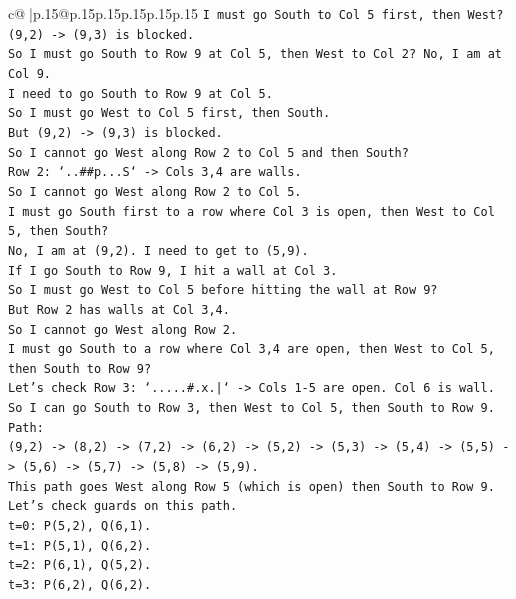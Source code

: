 \documentclass{article}
\begin{document}
{\begin{supertabular}{c@{$\;$}|p{.15\linewidth}@{}p{.15\linewidth}p{.15\linewidth}p{.15\linewidth}p{.15\linewidth}p{.15\linewidth}}
{{{\texttt{I must go South to Col 5 first, then West?} \\
\texttt{(9,2) {-}> (9,3) is blocked.} \\
\texttt{So I must go South to Row 9 at Col 5, then West to Col 2? No, I am at Col 9.} \\
\texttt{I need to go South to Row 9 at Col 5.} \\
\texttt{So I must go West to Col 5 first, then South.} \\
\texttt{But (9,2) {-}> (9,3) is blocked.} \\
\texttt{So I cannot go West along Row 2 to Col 5 and then South?} \\
\texttt{Row 2: `..\#\#p...S` {-}> Cols 3,4 are walls.} \\
\texttt{So I cannot go West along Row 2 to Col 5.} \\
\texttt{I must go South first to a row where Col 3 is open, then West to Col 5, then South?} \\
\texttt{No, I am at (9,2). I need to get to (5,9).} \\
\texttt{If I go South to Row 9, I hit a wall at Col 3.} \\
\texttt{So I must go West to Col 5 before hitting the wall at Row 9?} \\
\texttt{But Row 2 has walls at Col 3,4.} \\
\texttt{So I cannot go West along Row 2.} \\
\texttt{I must go South to a row where Col 3,4 are open, then West to Col 5, then South to Row 9?} \\
\texttt{Let's check Row 3: `.....\#.x.|` {-}> Cols 1{-}5 are open. Col 6 is wall.} \\
\texttt{So I can go South to Row 3, then West to Col 5, then South to Row 9.} \\
\texttt{Path:} \\
\texttt{(9,2) {-}> (8,2) {-}> (7,2) {-}> (6,2) {-}> (5,2) {-}> (5,3) {-}> (5,4) {-}> (5,5) {-}> (5,6) {-}> (5,7) {-}> (5,8) {-}> (5,9).} \\
\texttt{This path goes West along Row 5 (which is open) then South to Row 9.} \\
\texttt{Let's check guards on this path.} \\
\texttt{t=0: P(5,2), Q(6,1).} \\
\texttt{t=1: P(5,1), Q(6,2).} \\
\texttt{t=2: P(6,1), Q(5,2).} \\
\texttt{t=3: P(6,2), Q(6,2).} \\
}}}
\end{supertabular}}
\end{document}
